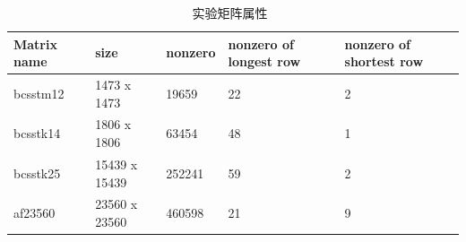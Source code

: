\documentclass[11pt,twocolumn]{article}
\begin{document}
\clearpage
\begin {table}[h]
\caption {实验矩阵属性~\cite{MatrixMarket}} \label{tab:tab_matrix} 

	\begin{tabular}{|p{2cm}|p{3cm}|p{2cm}|p{2cm}|p{2cm}|}
	\hline
	Matrix name              & size & nonzero & nonzero of longest row & nonzero of shortest row  \\
	\hline
	bcsstm12 & 1473 x 1473 & 19659 & 22 & 2   \\
	bcsstk14  & 1806 x 1806 & 63454 & 48 & 1    \\
	bcsstk25   & 15439 x 15439 & 252241 & 59 & 2  \\
	af23560    & 23560 x 23560 & 460598 & 21 & 9     \\
	\hline
	\end{tabular}
\end{table}
\end{document}
